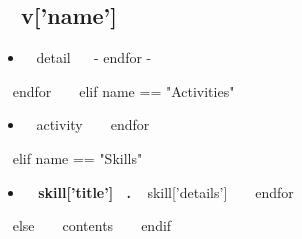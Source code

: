     \subsection{~{{ v['name'] }}~} %
    \begin{itemize}
    ~{ for detail in v['details'] }~
      \item ~{{ detail }}~
    ~{- endfor -}~
    \end{itemize}
  ~{ endfor }~
~{ elif name == "Activities" }~
    \begin{itemize}
  ~{ for activity in contents }~
    \item ~{{ activity }}~
  ~{ endfor }~
    \end{itemize}
~{ elif name == "Skills" }~
    \begin{itemize}
  ~{ for skill in contents }~
    \item { \bf ~{{ skill['title'] }}~. } ~{{ skill['details'] }}~
  ~{ endfor }~
    \end{itemize}
~{ else }~
  ~{{ contents }}~
~{ endif }~
